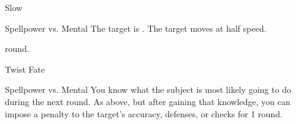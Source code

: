 \begin{spellsection}[Lesser]{Slow}
    \begin{spellheader}
    \end{spellheader}
    \begin{spellcontent}
        \begin{spelltargetinginfo}
        \end{spelltargetinginfo}
        \begin{spelleffects}
            \begin{spellattack}{Spellpower vs. Mental}
                \spellsuccess The target is \slowed.
                \spellfailure The target moves at half speed.
            \end{spellattack}
             round.
        \end{spelleffects}
    \end{spellcontent}
    \begin{spellfooter}
    \end{spellfooter}
\end{spellsection}

\begin{spellsection}{Twist Fate}
    \begin{spellheader}
    \end{spellheader}
    \begin{spellcontent}
        \begin{spelltargetinginfo}
        \end{spelltargetinginfo}
        \begin{spelleffects}
            \begin{spellattack}{Spellpower vs. Mental}
                \spellsuccess You know what the subject is most likely going to do during the next round.
                \spellcritical As above, but after gaining that knowledge, you can impose a  penalty to the target's accuracy, defenses, or checks for 1 round.
            \end{spellattack}
        \end{spelleffects}
    \end{spellcontent}
    \begin{spellfooter}
    \end{spellfooter}
\end{spellsection}
